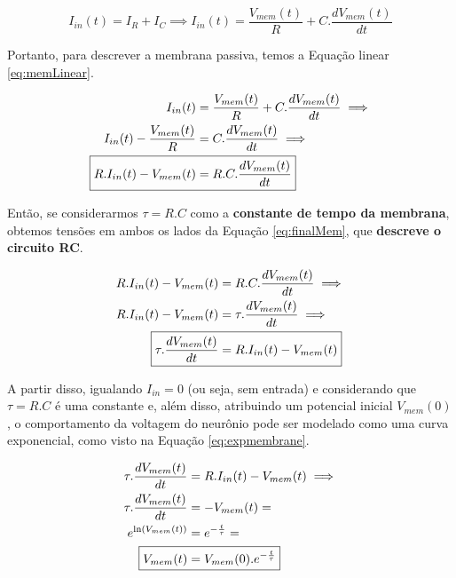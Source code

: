			\begin{equation}
				\label{eq:totalNeuronCurrent}
				I_{in}(t) = I_R + I_C \implies I_{in}(t) = \frac{V_{mem}(t)}{R} + C.\dfrac{dV_{mem}(t)}{dt}
			\end{equation}
		
			\par Portanto, para descrever a membrana passiva, temos a Equação linear \autoref{eq:memLinear}.
			
			\begin{equation}
				\label{eq:memLinear}
				\begin{aligned}
					I_{in}(t) &= \frac{V_{mem}(t)}{R} + C.\dfrac{dV_{mem}(t)}{dt} \implies \\ 
					I_{in}(t) - \frac{V_{mem}(t)}{R} &=  C.\dfrac{dV_{mem}(t)}{dt} \implies \\
					\Aboxed{R.I_{in}(t) - V_{mem}(t) &=  R.C.\dfrac{dV_{mem}(t)}{dt}}
				\end{aligned}
			\end{equation}
			
			\par Então, se considerarmos $\tau = R.C$ como a \textbf{constante de tempo da membrana}, obtemos tensões em ambos os lados da Equação \autoref{eq:finalMem}, que \textbf{descreve o circuito RC}.
			
			\begin{equation}
				\label{eq:finalMem}
				\begin{aligned}
					R.I_{in}(t) - V_{mem}(t) &=  R.C.\dfrac{dV_{mem}(t)}{dt} \implies \\
					R.I_{in}(t) - V_{mem}(t) &=  \tau.\dfrac{dV_{mem}(t)}{dt} \implies \\
					\Aboxed{\tau.\dfrac{dV_{mem}(t)}{dt} &= R.I_{in}(t) - V_{mem}(t)}
				\end{aligned}
			\end{equation}
			
			\par A partir disso, igualando $I_{in} = 0$ (ou seja, sem entrada) e considerando que $\tau = R.C$ é uma constante e, além disso, atribuindo um potencial inicial $V_{mem}(0)$, o comportamento da voltagem do neurônio pode ser modelado como uma curva exponencial, como visto na Equação \autoref{eq:expmembrane}.
			
			\begin{equation}
				\label{eq:expmembrane}
				\begin{aligned}
					\tau.\dfrac{dV_{mem}(t)}{dt} &= R.I_{in}(t) - V_{mem}(t) \implies \\
					\tau.\dfrac{dV_{mem}(t)}{dt} &= -V_{mem}(t) = \\
					e^{\ln(V_{mem}(t))} &= e^{-\frac{t}{\tau}} = \\
					\Aboxed{V_{mem}(t) &= V_{mem}(0).e^{-\frac{t}{\tau}}}
				\end{aligned}
			\end{equation}
			
